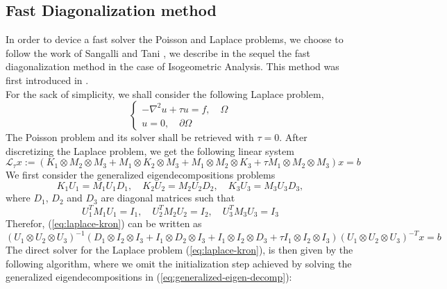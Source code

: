 \subsection{Fast Diagonalization method}
In order to device a fast solver the Poisson and Laplace problems, we choose to follow the work of Sangalli and Tani \cite{sangalli2016}, we describe in the sequel the fast diagonalization method in the case of Isogeometric Analysis. This method was first introduced in \cite{lynch1964}.
\\
For the sack of simplicity, we shall consider the following Laplace problem, 
\begin{equation}
  \begin{cases}
  - \nabla^2 u + \tau u = f, \quad \Omega \\ 
  u=0, \quad \partial\Omega
  \end{cases}
  \label{eq:laplace}
\end{equation}
The Poisson problem and its solver shall be retrieved with $\tau=0$.
After discretizing the Laplace problem, we get the following linear system
\begin{equation}
  \mathcal{L}_{\tau} x := \left( K_1 \otimes M_2 \otimes M_3 +  M_1 \otimes K_2 \otimes M_3 + M_1 \otimes M_2 \otimes K_3 + \tau M_1 \otimes M_2 \otimes M_3 \right) x = b 
  \label{eq:laplace-kron}
\end{equation}
We first consider the generalized eigendecompositions problems
\begin{equation}
  K_1 U_1 = M_1 U_1 D_1, \quad  
  K_2 U_2 = M_2 U_2 D_2, \quad 
  K_3 U_3 = M_3 U_3 D_3,
  \label{eq:generalized-eigen-decomp}
\end{equation}
where $D_1$, $D_2$ and $D_3$ are diagonal matrices such that
\begin{equation}
  U_1^T M_1 U_1 = I_1, \quad  
  U_2^T M_2 U_2 = I_2, \quad  
  U_3^T M_3 U_3 = I_3
\end{equation}
Therefor, (\ref{eq:laplace-kron}) can be written as
\begin{equation}
  \left( U_1 \otimes U_2 \otimes U_3 \right)^{-1} 
  \left( D_1 \otimes I_2 \otimes I_3 +  I_1 \otimes D_2 \otimes I_3 + I_1 \otimes I_2 \otimes D_3 + \tau I_1 \otimes I_2 \otimes I_3 \right) 
  \left( U_1 \otimes U_2 \otimes U_3 \right)^{-T} 
  x = b 
  \label{eq:laplace-kron-fact}
\end{equation}
The direct solver for the Laplace problem (\ref{eq:laplace-kron}), is then given by the following algorithm, where we omit the initialization step achieved by solving the generalized eigendecompositions in (\ref{eq:generalized-eigen-decomp}):
